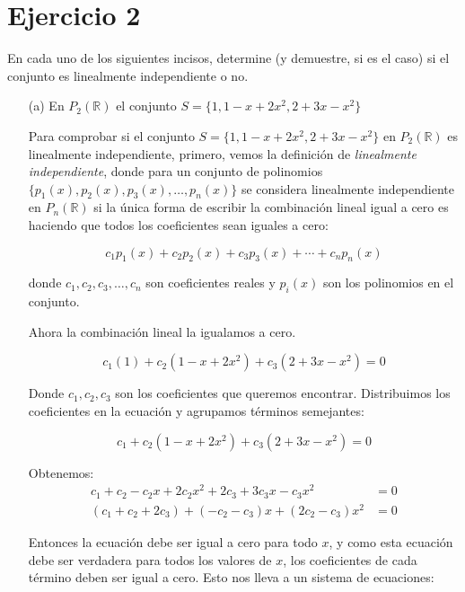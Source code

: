 \section*{Ejercicio 2}

En cada uno de los siguientes incisos, determine (y demuestre, si es el caso) si el conjunto es linealmente
independiente o no.

\begin{itemize}
    \item[(a)] En $P_{2}(\mathbb{R})$ el conjunto $S = \{ 1, 1 - x + 2x^{2}, 2 + 3x - x^{2} \}$  

    Para comprobar si el conjunto \(S = \{1, 1 - x + 2x^{2}, 2 + 3x - x^{2}\}\) en \(P_{2}(\mathbb{R})\) 
    es linealmente independiente, primero,  vemos la definición de \textit{linealmente independiente},
    donde para un conjunto de polinomios 
    \(\{p_1(x), p_2(x), p_3(x), \ldots, p_n(x)\}\)
    se considera linealmente independiente en \(P_{n}(\mathbb{R})\)
    si la única forma de escribir la combinación lineal 
    igual a cero es haciendo que todos los coeficientes
    sean iguales a cero:

    $$ c_{1} p_{1} (x) + c_{2}p_{2}(x) + c_{3} p_{3} (x) + \cdots + c_{n} p_{n}(x)$$

    donde \(c_1, c_2, c_3, \ldots, c_n\) son coeficientes reales y \(p_i(x)\) son los polinomios en el conjunto.

    Ahora la combinación lineal la igualamos a cero. 

    \[
        c_1(1) + c_2(1 - x + 2x^{2}) + c_3(2 + 3x - x^{2}) = 0
    \]

    Donde \(c_1, c_2, c_3\) son los coeficientes que queremos 
    encontrar. Distribuimos los coeficientes en la ecuación
    y agrupamos términos semejantes:

    \[
        c_1 + c_2(1 - x + 2x^{2}) + c_3(2 + 3x - x^{2}) = 0
    \]

    Obtenemos:    
    \begin{align*}
        c_1 + c_2 - c_2x + 2c_2x^{2} + 2c_3 + 3c_3x - c_3x^{2} & = 0 \\
        (c_1 + c_2 + 2c_3) + (-c_2 - c_3)x + (2c_2 - c_3)x^{2} & = 0
    \end{align*}
    

    Entonces la ecuación debe ser igual a cero para todo \(x\), y como esta ecuación debe ser verdadera para todos los valores de \(x\), los coeficientes de cada término deben ser igual a cero. Esto nos lleva a un sistema de ecuaciones:


\end{itemize}

